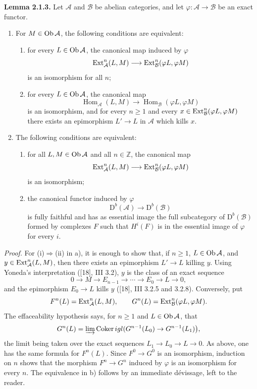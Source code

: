 \documentclass[11pt]{article}
\begin{document}
\textbf{Lemma 2.1.3.} Let $\mathcal A$ and $\mathcal B$ be abelian categories, and let $\varphi:\mathcal A\to\mathcal B$ be an exact functor.
\begin{enumerate}[label=\alph*)]
\item For $M\in\operatorname{Ob}\mathcal A$, the following conditions are equivalent:
\begin{enumerate}[label=(\roman*)]
\item for every $L\in\operatorname{Ob}\mathcal A$, the canonical map induced by $\varphi$
\[
\operatorname{Ext}^n_{\mathcal A}(L,M)\longrightarrow\operatorname{Ext}^n_{\mathcal B}(\varphi L,\varphi M)
\]
is an isomorphism for all $n$;
\item for every $L\in\operatorname{Ob}\mathcal A$, the canonical map
\[
\operatorname{Hom}_{\mathcal A}(L,M)\longrightarrow\operatorname{Hom}_{\mathcal B}(\varphi L,\varphi M)
\]
is an isomorphism, and for every $n\ge1$ and every $x\in\operatorname{Ext}^n_{\mathcal B}(\varphi L,\varphi M)$ there exists an epimorphism $L'\to L$ in $\mathcal A$ which kills $x$.
\end{enumerate}
\item The following conditions are equivalent:
\begin{enumerate}[label=(\roman*)]
\item for all $L,M\in\operatorname{Ob}\mathcal A$ and all $n\in\mathbb Z$, the canonical map
\[
\operatorname{Ext}^n_{\mathcal A}(L,M)\longrightarrow\operatorname{Ext}^n_{\mathcal B}(\varphi L,\varphi M)
\]
is an isomorphism;
\item the canonical functor induced by $\varphi$
\[
\mathrm D^b(\mathcal A)\longrightarrow\mathrm D^b(\mathcal B)
\]
is fully faithful and has as essential image the full subcategory of $\mathrm D^b(\mathcal B)$ formed by complexes $F$ such that $H^i(F)$ is in the essential image of $\varphi$ for every $i$.
\end{enumerate}
\end{enumerate}

\emph{Proof.} For (i)$\Rightarrow$(ii) in a), it is enough to show that, if $n\ge1$, $L\in\operatorname{Ob}\mathcal A$, and $y\in\operatorname{Ext}^n_{\mathcal A}(L,M)$, then there exists an epimorphism $L'\to L$ killing $y$. Using Yoneda's interpretation ([18], III 3.2), $y$ is the class of an exact sequence
\[
0\longrightarrow M\longrightarrow E_{n-1}\longrightarrow\cdots\longrightarrow E_0\longrightarrow L\longrightarrow0,
\]
and the epimorphism $E_0\to L$ kills $y$ ([18], III 3.2.5 and 3.2.8). Conversely, put
\[
F^n(L)=\operatorname{Ext}^n_{\mathcal A}(L,M),\qquad
G^n(L)=\operatorname{Ext}^n_{\mathcal B}(\varphi L,\varphi M).
\]
The effaceability hypothesis says, for $n\ge1$ and $L\in\operatorname{Ob}\mathcal A$, that
\[
G^n(L)=\varinjlim\operatorname{Coker}igl(G^{n-1}(L_0)\to G^{n-1}(L_1)\bigr),
\]
the limit being taken over the exact sequences $L_1\to L_0\to L\to0$. As above, one has the same formula for $F^n(L)$. Since $F^0\to G^0$ is an isomorphism, induction on $n$ shows that the morphism $F^n\to G^n$ induced by $\varphi$ is an isomorphism for every $n$. The equivalence in b) follows by an immediate dévissage, left to the reader.
\end{document}
